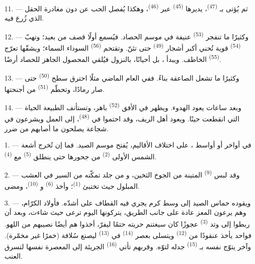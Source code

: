 11. --- ثم يُؤتى بـ \textsuperscript{(47)}، يديرها
 \textsuperscript{(45)} عبر  \textsuperscript{(46)}،
وهكذا يُفصل الحب عن  دون مغادرة الحقل الذي زُرع فيه.

\VUsaut{5.0mm}
\VUsaut{3.4mm}

12. --- وكثيرًا ما تنفجر  \textsuperscript{(53)} عنيفة في موسم
الحصاد. فيُسمع أولًا قصف  من بعيد؛ وتهبّ 
\textsuperscript{(54)} قوية تُحني أكبر أشجار  \textsuperscript{(49)}
حتى تئنّ. وتقتحم  \textsuperscript{(56)} السوداء السماء؛ ويشقّها
تعرّج  \textsuperscript{(55)} الخاطف. ويبدأ ، بل
 أحيانًا، بالنزول فيُلقي المحصول الجاهز للحصاد أرضًا.

13. --- وكثيرًا ما تشعل الصاعقة بناءً. ففي العام الماضي مثلًا احترق سطح
 \textsuperscript{(50)} حتى صار رمادًا، وتحطّم
 \textsuperscript{(51)} من أجنحتها.

14. --- وبعد ساعات يعود الهدوء. ويظهر في الأفق 
\textsuperscript{(52)} باهر، وتستأنف الطبيعة الحياة التي انقطعت حينًا. ويعود
أهل الريف، وقد احتموا في  \textsuperscript{(48)}، إلى العمل
ويشرعون في شجاعة يصلحون ما أصابهم من ضرر.

\VUsaut{6.0mm}
\VUsaut{3.6mm}

\VUsaut{1.4mm}
\VUsaut{4.0mm}

1. --- في أواخر  أو أواسط ، على اختلاف
الأقاليم، يُفتح موسم الصيد. فما إن تُخرج أشعة الشمس الأولى
 \textsuperscript{(2)} من جحورها حتى ينطلق 
\textsuperscript{(5)} مع  \textsuperscript{(4)}.

2. --- وقد لبس  \textsuperscript{(9)} المتينة من الجوخ
الثخين، و من جلد تمكّنه من السير في العشب المبلول حيث تختبئ
 \textsuperscript{(1)}؛ وأخذ  \textsuperscript{(6)}
و \textsuperscript{(10)}، ومضى.

3. --- ويقوده حماس الصيد إلى وسط كرم يجري فيه القطاف على أشدّه. فأولاد
الكرّام، وهم يرعون المعز عادة على جانب الطريق، يتركونها اليوم ترعى حيث
شاءت، وبعد أن ربطوا إلى وتد  \textsuperscript{(3)} عجوزًا كان
سيغتنم حريته حتمًا ليفرّ، أخذوا هم أيضًا نصيبهم من اللهو. فواحد يأخذ
عنقودًا من  \textsuperscript{(12)} ويتسلى بعصر 
\textsuperscript{(14)} في  \textsuperscript{(13)} ليصنع سُلافة (خمرًا غير
مخمّرة). وآخر يتوّج نفسه بـ \textsuperscript{(15)} جدله
لتوّه. وقربهم تأتي  \textsuperscript{(16)} الجريئة إلى المعصرة
نفسها لتسرق العنب.

